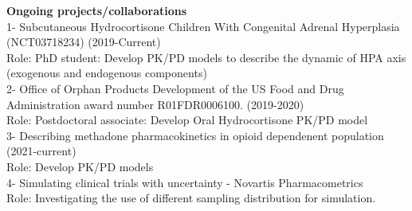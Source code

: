 \documentclass[a4paper,11pt]{article}
\begin{document}
\textbf{Ongoing projects/collaborations}\\
1- Subcutaneous Hydrocortisone Children With Congenital Adrenal Hyperplasia (NCT03718234) (2019-Current)
~\\
Role: PhD student: Develop PK/PD models to describe the dynamic of HPA axis (exogenous and endogenous components)
~\\
2- Office of Orphan Products Development of the US Food and Drug Administration award number R01FDR0006100. (2019-2020)
~\\
Role: Postdoctoral associate: Develop Oral Hydrocortisone PK/PD model
~\\
3- Describing methadone pharmacokinetics in opioid dependenent population (2021-current)
~\\
Role: Develop PK/PD models
~\\
4- Simulating clinical trials with uncertainty - Novartis Pharmacometrics
~\\
Role: Investigating the use of different sampling distribution for simulation.
~\\
\nocite{*}
\printbibliography[title=Publications, keyword=papers]

\printbibliography[title=In preparation/In Press, keyword=ongoing]
\end{document}
